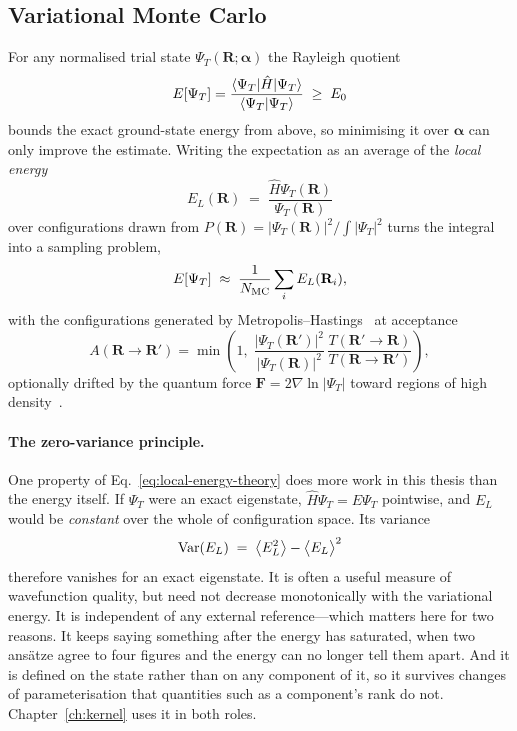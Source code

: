 \subsection{Variational Monte Carlo}
\label{subsec:vmc-theory}

For any normalised trial state $\Psi_T(\mathbf R;\boldsymbol\alpha)$ the Rayleigh quotient
\[
E[\Psi_T] = \frac{\braket{\Psi_T|\hat H|\Psi_T}}{\braket{\Psi_T|\Psi_T}} \;\ge\; E_0
\]
bounds the exact ground-state energy from above, so minimising it over $\boldsymbol\alpha$
can only improve the estimate. Writing the expectation as an average of the \emph{local
energy}
\begin{equation}
  E_L(\mathbf R) \;=\; \frac{\hat H\Psi_T(\mathbf R)}{\Psi_T(\mathbf R)}
  \label{eq:local-energy-theory}
\end{equation}
over configurations drawn from $P(\mathbf R)=|\Psi_T(\mathbf R)|^2/\!\int|\Psi_T|^2$ turns
the integral into a sampling problem,
\[
  E[\Psi_T] \;\approx\; \frac{1}{N_{\rm MC}}\sum_{i} E_L(\mathbf R_i),
\]
with the configurations generated by Metropolis--Hastings~\cite{Metropolis1953} at
acceptance
\[
A(\mathbf R \to \mathbf R') = \min\!\left(1,\;
\frac{|\Psi_T(\mathbf R')|^2}{|\Psi_T(\mathbf R)|^2}\,
\frac{T(\mathbf R'\to\mathbf R)}{T(\mathbf R\to\mathbf R')}\right),
\]
optionally drifted by the quantum force $\mathbf F=2\nabla\ln|\Psi_T|$ toward regions of
high density~\cite{KalosLevesqueVerlet1974-ImportanceSampling}.

\paragraph{The zero-variance principle.}
One property of Eq.~\eqref{eq:local-energy-theory} does more work in this thesis than the
energy itself. If $\Psi_T$ were an exact eigenstate, $\hat H\Psi_T=E\Psi_T$ pointwise, and
$E_L$ would be \emph{constant} over the whole of configuration space. Its variance
\begin{equation}
  \mathrm{Var}(E_L) \;=\; \big\langle E_L^2\big\rangle - \big\langle E_L\big\rangle^2
  \label{eq:varEL-theory}
\end{equation}
therefore vanishes for an exact eigenstate. It is often a useful measure of wavefunction
quality, but need not decrease monotonically with the variational energy. It is independent of any external
reference---which matters here for two reasons. It keeps saying something after the energy
has saturated, when two ansätze agree to four figures and the energy can no longer tell
them apart. And it is defined on the state rather than on any component of it, so it
survives changes of parameterisation that quantities such as a component's rank do not.
Chapter~\ref{ch:kernel} uses it in both roles.

